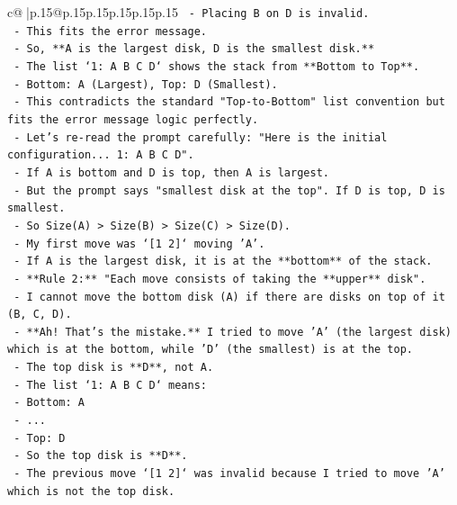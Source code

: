 \documentclass{article}
\begin{document}
{\begin{supertabular}{c@{$\;$}|p{.15\linewidth}@{}p{.15\linewidth}p{.15\linewidth}p{.15\linewidth}p{.15\linewidth}p{.15\linewidth}}
{{{\texttt{          {-} Placing B on D is invalid.} \\
\texttt{          {-} This fits the error message.} \\
\texttt{          {-} So, **A is the largest disk, D is the smallest disk.**} \\
\texttt{          {-} The list `1: A B C D` shows the stack from **Bottom to Top**.} \\
\texttt{          {-} Bottom: A (Largest), Top: D (Smallest).} \\
\texttt{          {-} This contradicts the standard "Top{-}to{-}Bottom" list convention but fits the error message logic perfectly.} \\
\texttt{          {-} Let's re{-}read the prompt carefully: "Here is the initial configuration... 1: A B C D".} \\
\texttt{          {-} If A is bottom and D is top, then A is largest.} \\
\texttt{          {-} But the prompt says "smallest disk at the top". If D is top, D is smallest.} \\
\texttt{          {-} So Size(A) > Size(B) > Size(C) > Size(D).} \\
\texttt{          {-} My first move was `{[}1 2{]}` moving 'A'.} \\
\texttt{          {-} If A is the largest disk, it is at the **bottom** of the stack.} \\
\texttt{          {-} **Rule 2:** "Each move consists of taking the **upper** disk".} \\
\texttt{          {-} I cannot move the bottom disk (A) if there are disks on top of it (B, C, D).} \\
\texttt{          {-} **Ah! That's the mistake.** I tried to move 'A' (the largest disk) which is at the bottom, while 'D' (the smallest) is at the top.} \\
\texttt{          {-} The top disk is **D**, not A.} \\
\texttt{          {-} The list `1: A B C D` means:} \\
\texttt{            {-} Bottom: A} \\
\texttt{            {-} ...} \\
\texttt{            {-} Top: D} \\
\texttt{          {-} So the top disk is **D**.} \\
\texttt{          {-} The previous move `{[}1 2{]}` was invalid because I tried to move 'A' which is not the top disk.} \\
}}}
\end{supertabular}}
\end{document}
